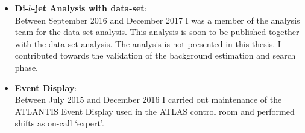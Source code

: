 \begin{itemize}[leftmargin=*]
\begin{itemize}
  \end{itemize}
  \vspace{1em}
\item\textbf{Di-$b$-jet Analysis  with \hm{} data-set}: \\
  Between September 2016 and December 2017 I was a member of the analysis team for the \hm{} data-set analysis.
  This analysis is soon to be published together with the \lm{} data-set analysis.
  The analysis is not presented in this thesis.
  I contributed towards the validation of the background estimation and search phase.\vspace{1em}
\item\textbf{Event Display}: \\
  Between July 2015 and December 2016 I carried out maintenance of the {\sc ATLANTIS} Event Display used in the ATLAS control room
  and performed shifts as on-call `expert'.
\end{itemize}







